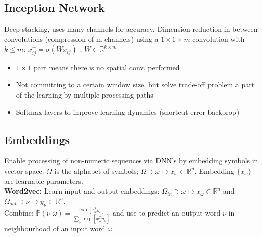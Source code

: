 \subsection{Inception Network}
Deep stacking, uses many channels for accuracy. Dimension reduction in between convolutions (compression of m channels) using a $1\times 1\times m$ convolution with $k\leq m$: $x_{ij}^+ = \sigma(Wx_{ij})$ ; $W \in \mathbb{R}^{k\times m}$
\begin{itemize}
    \item $1\times 1$ part means there is no spatial conv. performed
    \item Not committing to a certain window size, but solve trade-off problem a part of the learning by multiple processing paths
    \item Softmax layers to improve learning dynamics (shortcut error backprop)
\end{itemize}
\subsection{Embeddings}
Enable processing of non-numeric sequences via DNN's by embedding symbols in vector space. $\Omega$ is the alphabet of symbols; $\Omega \ni \omega \mapsto x_{\omega} \in \mathbb{R}^n$. Embedding $\{x_{\omega}\}$ are learnable parameters.\\
\textbf{Word2vec:} Learn input and output embeddings: $\Omega_{in} \ni \omega \mapsto x_{\omega} \in \mathbb{R}^n$ and $\Omega_{out} \ni \nu \mapsto y_{\nu} \in  \mathbb{R}^n$. \\Combine: $\mathbb{P}(\nu|\omega) = \frac{\exp[x^T_{\omega}y_{\nu}]}{\sum_{\mu}\exp[x^T_{\omega}y_{\mu}]}$
and use to predict an output word $\nu$ in neighbourhood of an input word $\omega$

